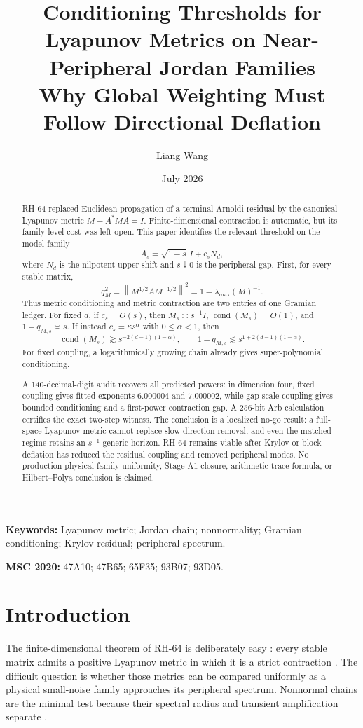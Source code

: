 \documentclass[11pt]{article}
\title{Conditioning Thresholds for Lyapunov Metrics on Near-Peripheral
Jordan Families\\
\large Why Global Weighting Must Follow Directional Deflation}
\author{Liang Wang}
\date{July 2026}
\newcommand{\norm}[1]{\left\lVert#1\right\rVert}
\newcommand{\cond}{\operatorname{cond}}
\begin{document}
\maketitle

\begin{abstract}
RH-64 replaced Euclidean propagation of a terminal Arnoldi residual by the
canonical Lyapunov metric $M-A^*MA=I$.  Finite-dimensional contraction is
automatic, but its family-level cost was left open.  This paper identifies
the relevant threshold on the model family
\[
 A_s=\sqrt{1-s}\,I+c_sN_d,
\]
where $N_d$ is the nilpotent upper shift and $s\downarrow0$ is the
peripheral gap.  First, for every stable matrix,
\[
 q_M^2=\norm{M^{1/2}AM^{-1/2}}^2
      =1-\lambda_{\max}(M)^{-1}.
\]
Thus metric conditioning and metric contraction are two entries of one
Gramian ledger.  For fixed $d$, if $c_s=O(s)$, then
$M_s\asymp s^{-1}I$, $\cond(M_s)=O(1)$, and $1-q_{M,s}\asymp s$.
If instead $c_s=\kappa s^\alpha$ with $0\le\alpha<1$, then
\[
 \cond(M_s)\gtrsim
 s^{-2(d-1)(1-\alpha)},\qquad
 1-q_{M,s}\lesssim
 s^{1+2(d-1)(1-\alpha)}.
\]
For fixed coupling, a logarithmically growing chain already gives
super-polynomial conditioning.

A 140-decimal-digit audit recovers all predicted powers: in dimension four,
fixed coupling gives fitted exponents $6.000004$ and $7.000002$, while
gap-scale coupling gives bounded conditioning and a first-power contraction
gap.  A 256-bit Arb calculation certifies the exact two-step witness.  The
conclusion is a localized no-go result: a full-space Lyapunov metric cannot
replace slow-direction removal, and even the matched regime retains an
$s^{-1}$ generic horizon.  RH-64 remains viable after Krylov or block
deflation has reduced the residual coupling and removed peripheral modes.
No production physical-family uniformity, Stage A1 closure, arithmetic trace
formula, or Hilbert--Polya conclusion is claimed.
\end{abstract}

\noindent\textbf{Keywords:} Lyapunov metric; Jordan chain; nonnormality;
Gramian conditioning; Krylov residual; peripheral spectrum.

\medskip
\noindent\textbf{MSC 2020:} 47A10; 47B65; 65F35; 93B07; 93D05.

\section{Introduction}

The finite-dimensional theorem of RH-64 is deliberately easy
\citep{WangWeightedResidual2026}: every stable
matrix admits a positive Lyapunov metric in which it is a strict contraction
\citep{ZhouDoyleGlover1996}.  The difficult question is whether those metrics
can be compared uniformly as a physical small-noise family approaches its
peripheral spectrum.  Nonnormal chains are the minimal test because their
spectral radius and transient amplification separate
\citep{TrefethenEmbree2005}.
\end{document}
